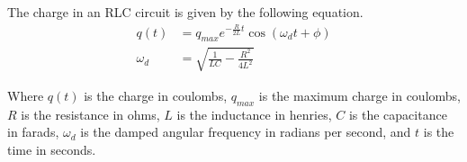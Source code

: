 The charge in an RLC circuit is given by the following equation.
\begin{align*}
    q(t) &= q_{max}e^{-\frac{R}{2L}t}\cos(\omega_d t + \phi)\\
    \omega_d &= \sqrt{\frac{1}{LC} - \frac{R^2}{4L^2}}
\end{align*}

Where $q(t)$ is the charge in coulombs, $q_{max}$ is the maximum charge in coulombs, $R$ is the resistance in ohms, $L$ is the inductance in henries, $C$ is the capacitance in farads, 
$\omega_d$ is the damped angular frequency in radians per second, and $t$ is the time in seconds.\\
